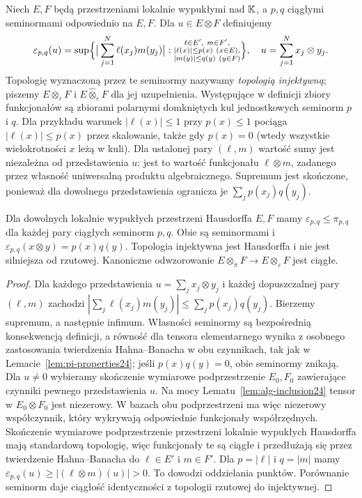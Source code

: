 \begin{definicja}
\label{def:eps-seminorm24}
Niech $E,F$ będą przestrzeniami lokalnie wypukłymi nad $\mathbb K$,
a $p,q$ ciągłymi seminormami odpowiednio na $E,F$.
Dla $u\in E\otimes F$ definiujemy
\[
 \varepsilon_{p,q}(u)=
 \sup\Bigl\{\big|\sum_{j=1}^N\ell(x_j)m(y_j)\big|:
 \substack{\ell\in E',\ m\in F',\\
             |\ell(x)|\le p(x)\ (x\in E),\\
             |m(y)|\le q(y)\ (y\in F)}\Bigr\},
 \quad u=\sum_{j=1}^N x_j\otimes y_j.
\]
Topologię wyznaczoną przez te seminormy nazywamy
\emph{topologią injektywną}; piszemy
$E\otimes_\varepsilon F$ i
$E\widehat\otimes_\varepsilon F$ dla jej uzupełnienia.
Występujące w definicji zbiory funkcjonałów są zbiorami
polarnymi domkniętych kul jednostkowych seminorm $p$ i $q$.
Dla przykładu warunek $|\ell(x)|\le1$ przy $p(x)\le1$
pociąga $|\ell(x)|\le p(x)$ przez skalowanie, także gdy
$p(x)=0$ (wtedy wszystkie wielokrotności $x$ leżą w kuli).
Dla ustalonej pary $(\ell,m)$ wartość sumy jest niezależna
od przedstawienia $u$: jest to wartość funkcjonału
$\ell\otimes m$, zadanego przez własność uniwersalną
produktu algebraicznego. Supremum jest skończone, ponieważ
dla dowolnego przedstawienia ogranicza je
$\sum_j p(x_j)q(y_j)$.
\end{definicja}

\begin{twierdzenie}
\label{thm:eps-pi24}
Dla dowolnych lokalnie wypukłych przestrzeni Hausdorffa
$E,F$ mamy $\varepsilon_{p,q}\le\pi_{p,q}$ dla każdej
pary ciągłych seminorm $p,q$. Obie są seminormami i
$\varepsilon_{p,q}(x\otimes y)=p(x)q(y)$.
Topologia injektywna jest Hausdorffa i nie jest silniejsza
od rzutowej. Kanoniczne odwzorowanie
$E\otimes_\pi F\to E\otimes_\varepsilon F$ jest ciągłe.
\end{twierdzenie}
\begin{proof}
Dla każdego przedstawienia $u=\sum_jx_j\otimes y_j$
i każdej dopuszczalnej pary $(\ell,m)$ zachodzi
$|\sum_j\ell(x_j)m(y_j)|\le\sum_jp(x_j)q(y_j)$.
Bierzemy supremum, a następnie infimum. Własności
seminormy są bezpośrednią konsekwencją definicji,
a równość dla tensora elementarnego wynika z osobnego
zastosowania twierdzenia Hahna--Banacha w obu czynnikach,
tak jak w Lemacie~\ref{lem:pi-properties24}; jeśli
$p(x)q(y)=0$, obie seminormy znikają.
Dla $u\ne0$ wybieramy skończenie wymiarowe podprzestrzenie
$E_0,F_0$ zawierające czynniki pewnego przedstawienia $u$.
Na mocy Lematu~\ref{lem:alg-inclusion24} tensor w
$E_0\otimes F_0$ jest niezerowy. W bazach obu
podprzestrzeni ma więc niezerowy współczynnik,
który wykrywają odpowiednie funkcjonały współrzędnych.
Skończenie wymiarowe podprzestrzenie przestrzeni
lokalnie wypukłych Hausdorffa mają standardową topologię,
więc funkcjonały te są ciągłe i przedłużają się przez
twierdzenie Hahna--Banacha do $\ell\in E'$ i $m\in F'$.
Dla $p=|\ell|$ i $q=|m|$ mamy
$\varepsilon_{p,q}(u)\ge|(\ell\otimes m)(u)|>0$.
To dowodzi oddzielania punktów.
Porównanie seminorm daje ciągłość identyczności z
topologii rzutowej do injektywnej.
\end{proof}


